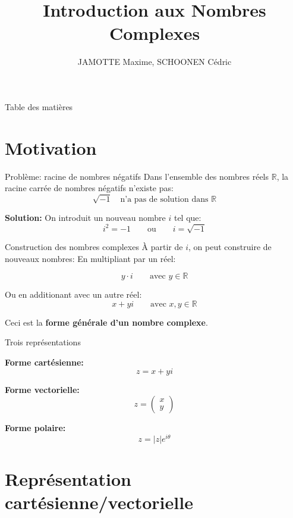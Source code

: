 \documentclass[aspectratio=169,12pt]{beamer}
\title[Nombres Complexes]{Introduction aux Nombres Complexes}
\author{JAMOTTE Maxime, SCHOONEN Cédric}
\institute{Digital Learning Hub}
\date{}
\begin{document}
\begin{frame}
  \titlepage
\end{frame}

\begin{frame}{Table des matières}
  \tableofcontents
\end{frame}

\section{Motivation}

\begin{frame}{Problème: racine de nombres négatifs}
  Dans l'ensemble des nombres réels $\mathbb{R}$, la racine carrée de nombres négatifs n'existe pas:
  \[
    \sqrt{-1} \quad \text{n'a pas de solution dans } \mathbb{R}
  \]
  
  \bigskip
  \textbf{Solution:} On introduit un nouveau nombre $i$ tel que:
  \[
    i^2 = -1 \qquad \text{ou} \qquad i = \sqrt{-1}
  \]
\end{frame}

\begin{frame}{Construction des nombres complexes}
  À partir de $i$, on peut construire de nouveaux nombres: En multipliant par un réel:
  
  \[
    y \cdot i \qquad \text{avec } y \in \mathbb{R}
  \]
  
  \bigskip
  Ou en additionant avec un autre réel:
  \[
    x + yi \qquad \text{avec } x, y \in \mathbb{R}
  \]
  
  \bigskip
  Ceci est la \textbf{forme générale d'un nombre complexe}.
\end{frame}

\begin{frame}{Trois représentations}
  
  \bigskip
  \textbf{Forme cartésienne:}
  \[
    z = x + yi
  \]
  
  \textbf{Forme vectorielle:}
  \[
    z = \begin{pmatrix} x \\ y \end{pmatrix}
  \]
  
  \textbf{Forme polaire:}
  \[
    z = |z| e^{i\theta}
  \]
\end{frame}

\section{Représentation cartésienne/vectorielle}
\end{document}
